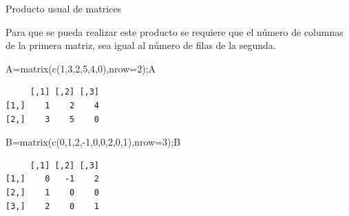 \documentclass[
  ignorenonframetext,
  aspectratio=169,
  spanish,
]{beamer}
\newenvironment{Shaded}{\begin{snugshade}}{\end{snugshade}}
\newcommand{\AttributeTok}[1]{\textcolor[rgb]{0.40,0.45,0.13}{#1}}
\newcommand{\DecValTok}[1]{\textcolor[rgb]{0.68,0.00,0.00}{#1}}
\newcommand{\FunctionTok}[1]{\textcolor[rgb]{0.28,0.35,0.67}{#1}}
\newcommand{\NormalTok}[1]{\textcolor[rgb]{0.00,0.23,0.31}{#1}}
\newcommand{\OtherTok}[1]{\textcolor[rgb]{0.00,0.23,0.31}{#1}}
\newcommand{\SpecialCharTok}[1]{\textcolor[rgb]{0.37,0.37,0.37}{#1}}
\begin{document}
\begin{frame}[fragile]{Producto usual de matrices}
\label{producto-usual-de-matrices}
\begin{tcolorbox}[enhanced jigsaw, breakable, arc=.35mm, title=\textcolor{quarto-callout-important-color}{\faExclamation}\hspace{0.5em}{Importante}, coltitle=black, colbacktitle=quarto-callout-important-color!10!white, bottomtitle=1mm, leftrule=.75mm, left=2mm, titlerule=0mm, colback=white, toptitle=1mm, opacitybacktitle=0.6, rightrule=.15mm, opacityback=0, bottomrule=.15mm, toprule=.15mm, colframe=quarto-callout-important-color-frame]

Para que se pueda realizar este producto se requiere que el número de
columnas de la primera matriz, sea igual al número de filas de la
segunda.

\end{tcolorbox}

\begin{Shaded}
\begin{Highlighting}[]
\NormalTok{A}\OtherTok{=}\FunctionTok{matrix}\NormalTok{(}\FunctionTok{c}\NormalTok{(}\DecValTok{1}\NormalTok{,}\DecValTok{3}\NormalTok{,}\DecValTok{2}\NormalTok{,}\DecValTok{5}\NormalTok{,}\DecValTok{4}\NormalTok{,}\DecValTok{0}\NormalTok{),}\AttributeTok{nrow=}\DecValTok{2}\NormalTok{);A }
\end{Highlighting}
\end{Shaded}

\begin{verbatim}
     [,1] [,2] [,3]
[1,]    1    2    4
[2,]    3    5    0
\end{verbatim}

\begin{Shaded}
\begin{Highlighting}[]
\NormalTok{B}\OtherTok{=}\FunctionTok{matrix}\NormalTok{(}\FunctionTok{c}\NormalTok{(}\DecValTok{0}\NormalTok{,}\DecValTok{1}\NormalTok{,}\DecValTok{2}\NormalTok{,}\SpecialCharTok{{-}}\DecValTok{1}\NormalTok{,}\DecValTok{0}\NormalTok{,}\DecValTok{0}\NormalTok{,}\DecValTok{2}\NormalTok{,}\DecValTok{0}\NormalTok{,}\DecValTok{1}\NormalTok{),}\AttributeTok{nrow=}\DecValTok{3}\NormalTok{);B}
\end{Highlighting}
\end{Shaded}

\begin{verbatim}
     [,1] [,2] [,3]
[1,]    0   -1    2
[2,]    1    0    0
[3,]    2    0    1
\end{verbatim}
\end{frame}
\end{document}
